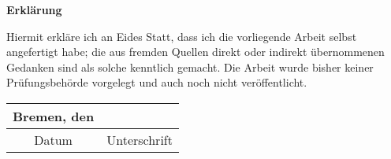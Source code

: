 \thispagestyle{empty}
\begin{center}
\huge \textbf{Erklärung}
\end{center}
\vspace{5cm}
Hiermit erkläre ich an Eides Statt, dass ich die vorliegende Arbeit selbst angefertigt habe; 
die aus fremden Quellen direkt oder indirekt übernommenen Gedanken sind als solche kenntlich 
gemacht. Die Arbeit wurde bisher keiner Prüfungsbehörde vorgelegt und auch noch nicht veröffentlicht.
\vspace*{8cm}
\begin{table}[h!]
 \centering
 \begin{tabular}{cc}
  Bremen, den \iftoggle{german}{\ThesisPubDate}{\germandate{\ThesisPubDate}} & \hspace*{6cm} \\
  \midrule
  Datum								& Unterschrift\\
 \end{tabular}
\end{table}